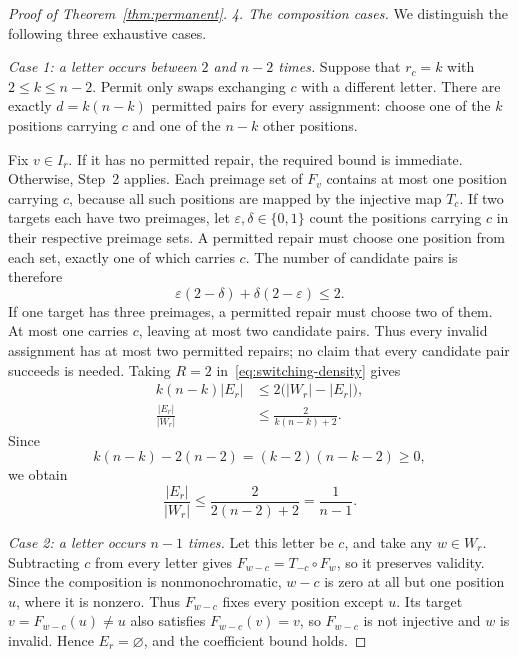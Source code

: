 \documentclass[11pt,a4paper]{article}
\numberwithin{equation}{section}
\numberwithin{figure}{section}
\numberwithin{table}{section}
\numberwithin{footnote}{section}
\theoremstyle{informal}\newtheorem*{informaltheorem}{Informal theorem}
\theoremstyle{definition}\newtheorem{example}{Example}[section]
\theoremstyle{remark}\newtheorem{remark}[theorem]{Remark}
\begin{document}
\begin{proof}[Proof of Theorem~\ref{thm:permanent}]
\emph{4. The composition cases.}
We distinguish the following three exhaustive cases.

\emph{Case 1: a letter occurs between \(2\) and \(n-2\) times.}
Suppose that \(r_c=k\) with \(2\leq k\leq n-2\).
Permit only swaps exchanging \(c\) with a different letter.
There are exactly \(d=k(n-k)\) permitted pairs for every assignment:
choose one of the \(k\) positions carrying \(c\) and one of the
\(n-k\) other positions.

Fix \(v\in I_r\). If it has no permitted repair, the required
bound is immediate. Otherwise, Step~2 applies. Each preimage set of
\(F_v\) contains at most one position carrying \(c\), because all
such positions are mapped by the injective map \(T_c\).
If two targets each have two preimages, let
\(\varepsilon,\delta\in\{0,1\}\) count the positions carrying
\(c\) in their respective preimage sets. A permitted repair must
choose one position from each set, exactly one of which carries
\(c\). The number of candidate pairs is therefore
\begin{equation}
 \varepsilon(2-\delta)+\delta(2-\varepsilon)\leq2.
\end{equation}
If one target has three preimages, a permitted repair must choose
two of them. At most one carries \(c\), leaving at most two
candidate pairs. Thus every invalid assignment has at most two
permitted repairs; no claim that every candidate pair succeeds is
needed. Taking \(R=2\) in~\eqref{eq:switching-density} gives
\begin{equation}\label{eq:two}
 \begin{aligned}
 k(n-k)|E_r|&\leq2\bigl(|W_r|-|E_r|\bigr),\\
 \frac{|E_r|}{|W_r|}&\leq\frac2{k(n-k)+2}.
 \end{aligned}
\end{equation}
Since
\begin{equation}
 k(n-k)-2(n-2)=(k-2)(n-k-2)\geq0,
\end{equation}
we obtain
\begin{equation}
 \frac{|E_r|}{|W_r|}
 \leq\frac2{2(n-2)+2}=\frac1{n-1}.
\end{equation}

\emph{Case 2: a letter occurs \(n-1\) times.}
Let this letter be \(c\), and take any \(w\in W_r\).
Subtracting \(c\) from every letter gives
\(F_{w-c}=T_{-c}\circ F_w\), so it preserves validity.
Since the composition is nonmonochromatic, \(w-c\) is zero at
all but one position \(u\), where it is nonzero. Thus
\(F_{w-c}\) fixes every position except \(u\). Its target
\(v=F_{w-c}(u)\ne u\) also satisfies \(F_{w-c}(v)=v\),
so \(F_{w-c}\) is not injective and \(w\) is invalid.
Hence \(E_r=\varnothing\), and the coefficient bound holds.


\end{proof}
\end{document}
